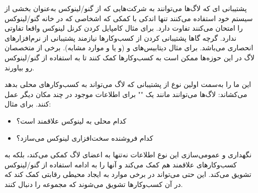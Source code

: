 پشتیبانی ای که لاگ‌ها می‌توانند به شرکت‌هایی که از گنو/لینوکس
به‌عنوان بخشی از سیستم خود استفاده می‌کنند تنها اندکی با کمکی
که اشخاصی که در خانه گنو/لینوکس را امتحان می‌کنند تفاوت دارد.
برای مثال کامپایل کردن کرنل لینوکس واقعا تفاوتی ندارد.
گرچه گاها پشتیبانی کردن از کسب‌وکار‌ها نیازمند پشتیبانی از
نرم‌افزارهای انحصاری می‌باشد. برای مثال دیتابیس‌های
 و 
(و یا
و موارد مشابه).
برخی از متخصصان لاگ در این حوزه‌ها ممکن است به کسب‌وکار‌ها کمک کنند
تا به استفاده از گنو/لینوکس رو بیاورند.

این ما را به‌سمت اولین نوع از پشتیبانی که لاگ می‌تواند به
کسب‌وکار‌های محلی بدهد می‌کشاند: لاگ‌ها می‌توانند مانند یک
""
برای اطلاعات موجود در چند مکان دیگر عمل کنند. برای مثال:

\begin{itemize}
\item
کدام  محلی به لینوکس علاقمند است؟
\item
کدام فروشنده سخت‌افزاری  لینوکس می‌سازد؟
\end{itemize}


نگهداری و عمومی‌سازی این نوع اطلاعات نه‌تنها به اعضای لاگ کمکی می‌کند،
بلکه به کسب‌وکارهای علاقمند هم کمک می‌کند و آنها را به ادامه استفاده از
گنو/لینوکس تشویق می‌کند.
این حتی می‌تواند در برخی موارد به ایجاد محیطی رقابتی کمک کند که
در آن کسب‌وکار‌ها تشویق می‌شوند که مجموعه را دنبال کنند.

